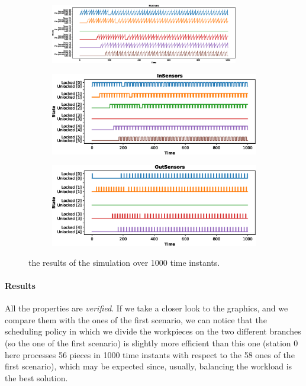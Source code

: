 \documentclass[a4paper]{article}
\begin{document}
    \begin{figure}[h!]
        \begin{subfigure}{\textwidth}
            \centering
            \includegraphics[width=0.9\textwidth]{images/scenarios/scenario3_stations}
        \end{subfigure}
        \begin{subfigure}{0.49\textwidth}
            \centering
            \includegraphics[width=\textwidth]{images/scenarios/scenario3_insensors}
        \end{subfigure}
        \hfill
        \begin{subfigure}{0.49\textwidth}
            \centering
            \includegraphics[width=\textwidth]{images/scenarios/scenario3_outsensors}
        \end{subfigure}
        \caption{the results of the simulation over 1000 time instants.}
    \end{figure}

    \paragraph{Results} All the properties are \textit{verified}. If we take a closer look to the graphics, and we compare them with the ones of the first scenario, we can notice that the scheduling policy in which we divide the workpieces on the two different branches (so the one of the first scenario) is slightly more efficient than this one (station 0 here processes 56 pieces in 1000 time instants with respect to the 58 ones of the first scenario), which may be expected since, usually, balancing the workload is the best solution.
\end{document}

